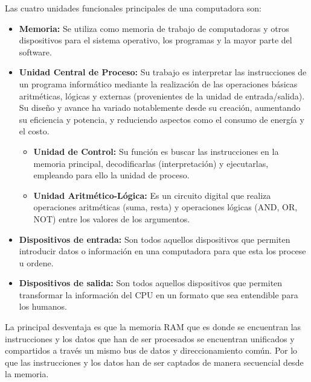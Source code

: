 \documentclass[answers]{exam}
\begin{document}
\begin{questions}
  \begin{solution}
    Las cuatro unidades funcionales principales de una computadora son:
    \begin{itemize}
      \item \textbf{Memoria:} Se utiliza como memoria de trabajo de computadoras
            y otros dispositivos para el sistema operativo, los programas y la
            mayor parte del software.
      \item \textbf{Unidad Central de Proceso:} Su trabajo es interpretar las
            instrucciones de un programa informático mediante la realización de
            las operaciones básicas aritméticas, lógicas y externas
            (provenientes de la unidad de entrada/salida). Su diseño y avance ha
            variado notablemente desde su creación, aumentando su eficiencia y
            potencia, y reduciendo aspectos como el consumo de energía y el
            costo.
            \begin{itemize}
              \item \textbf{Unidad de Control:} Su función es buscar las
                    instrucciones en la memoria principal, decodificarlas
                    (interpretación) y ejecutarlas, empleando para ello la
                    unidad de proceso.
              \item \textbf{Unidad Aritmético-Lógica:} Es un circuito digital
                    que realiza operaciones aritméticas (suma, resta) y
                    operaciones lógicas (AND, OR, NOT) entre los valores de los
                    argumentos.
            \end{itemize}
      \item \textbf{Dispositivos de entrada:} Son todos aquellos dispositivos
            que permiten introducir datos o información en una computadora para
            que esta los procese u ordene.
      \item \textbf{Dispositivos de salida:} Son todos aquellos dispositivos que
            permiten transformar la información del CPU en un formato que sea
            entendible para los humanos.
    \end{itemize}
  \end{solution}

  \begin{solution}
    La principal desventaja es que la memoria RAM que es donde se encuentran las
    instrucciones y los datos que han de ser procesados se encuentran unificados
    y compartidos a través un mismo bus de datos y direccionamiento común. Por
    lo que las instrucciones y los datos han de ser captados de manera
    secuencial desde la memoria.
  \end{solution}


\end{questions}
\end{document}
